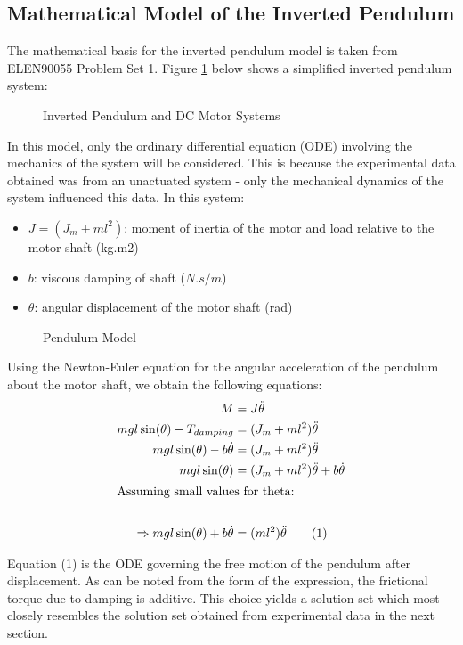 \documentclass[11pt, a4paper,twocolumn]{article}
\begin{document}
\subsection{	Mathematical Model of the Inverted Pendulum		}
The mathematical basis for the inverted pendulum model is taken from ELEN90055 Problem Set 1. Figure \ref{fig:diagram} below shows a simplified inverted pendulum system:

\begin{figure}[h!]
\centering
\caption{Inverted Pendulum and DC Motor Systems}
\label{fig:diagram}
\end{figure}

In this model, only the ordinary differential equation (ODE) involving the mechanics of the system will be considered. This is because the experimental data obtained was from an unactuated system - only the mechanical dynamics of the system influenced this data. In this system:
\begin{itemize}
	\item $J = (J_m + ml^2)$: moment of inertia of the motor and load relative to the motor shaft (kg.m2)
	\item $b$: viscous damping of shaft ($N.s/m$)
	\item $\theta$: angular displacement of the motor shaft (rad)
\end{itemize}

\begin{figure}[h!]
\centering
\caption{Pendulum Model}
\label{fig:pend}
\end{figure}

Using the Newton-Euler equation for the angular acceleration of the pendulum about the motor shaft, we obtain the following equations:
\begin{align*}
	M &= J\ddot{\theta}	\\
	mgl\sin(\theta)-T_{damping} &= (J_m + ml^2)\ddot{\theta}\\
	mgl\sin(\theta) - b\dot\theta &= (J_m+ml^2)\ddot{\theta}\\
	mgl\sin(\theta) &= (J_m + ml^2)\ddot{\theta} + b\dot\theta\\
	\intertext{Assuming small values for theta:}\\
	\Rightarrow mgl\sin(\theta) + b\dot\theta &= (ml^2)\ddot{\theta} \qquad \text{(1)}\\
\end{align*}

Equation (1) is the ODE governing the free motion of the pendulum after displacement. As can be noted from the form of the expression, the frictional torque due to damping is additive. This choice yields a solution set which most closely resembles the solution set obtained from experimental data in the next section.
\end{document}

